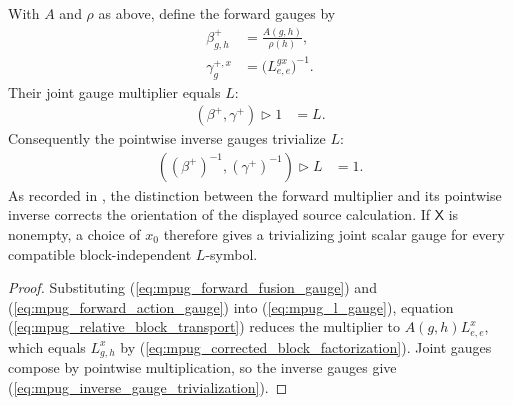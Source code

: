 \begin{lemma}
    \label{thm:mpug_block_independence_inverse_gauge}
    \leanok
    With $A$ and $\rho$ as above, define the forward gauges by
    \begin{align}
        \beta^+_{g,h}
         & =\frac{A(g,h)}{\rho(h)},
        \label{eq:mpug_forward_fusion_gauge} \\
        \gamma^{+,x}_g
         & =\bigl(L^{g x}_{e,e}\bigr)^{-1}.
        \label{eq:mpug_forward_action_gauge}
    \end{align}
    Their joint gauge multiplier equals $L$:
    \begin{align}
        (\beta^+,\gamma^+)\mathbin{\triangleright}1
         & =L.
        \label{eq:mpug_forward_gauge_multiplier}
    \end{align}
    Consequently the pointwise inverse gauges trivialize $L$:
    \begin{align}
        ((\beta^+)^{-1},(\gamma^+)^{-1})
        \mathbin{\triangleright}L
         & =1.
        \label{eq:mpug_inverse_gauge_trivialization}
    \end{align}
    As recorded in \cite{gap:fbc25_block_independence_reciprocal_errors}, the
    distinction between the forward multiplier and its pointwise inverse
    corrects the orientation of the displayed source calculation.
    If $\mathsf X$ is nonempty, a choice of $x_0$ therefore gives a
    trivializing joint scalar gauge for every compatible block-independent
    $L$-symbol.
\end{lemma}

\begin{proof}\leanok
    Substituting (\ref{eq:mpug_forward_fusion_gauge}) and
    (\ref{eq:mpug_forward_action_gauge}) into
    (\ref{eq:mpug_l_gauge}), equation
    (\ref{eq:mpug_relative_block_transport}) reduces the multiplier to
    $A(g,h)L^x_{e,e}$, which equals $L^x_{g,h}$ by
    (\ref{eq:mpug_corrected_block_factorization}). Joint gauges compose by
    pointwise multiplication, so the inverse gauges give
    (\ref{eq:mpug_inverse_gauge_trivialization}).
\end{proof}

